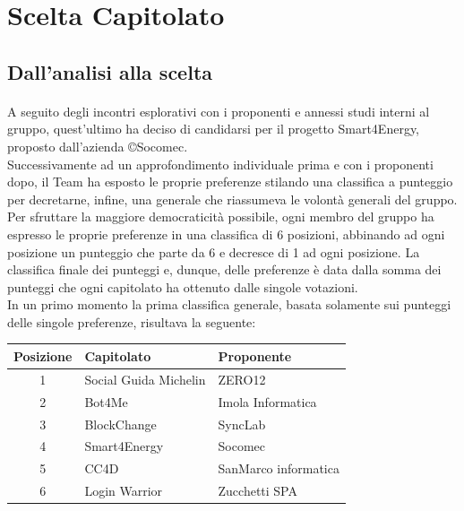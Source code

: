 \tableofcontents
\newpage
\section{Scelta Capitolato}
\subsection{Dall'analisi alla scelta}
\paragraph{}
A seguito degli incontri esplorativi con i proponenti e annessi studi interni
al gruppo, quest'ultimo ha deciso di candidarsi per il progetto Smart4Energy,
proposto dall'azienda \copyright Socomec.\\
Successivamente ad un approfondimento individuale prima e con i proponenti dopo,
il Team ha esposto le proprie preferenze stilando una classifica a punteggio per
decretarne, infine, una generale che riassumeva le volontà generali del gruppo.\\
Per sfruttare la maggiore democraticità possibile, ogni membro del gruppo ha
espresso le proprie preferenze in una classifica di 6 posizioni, abbinando ad
ogni posizione un punteggio che parte da 6 e decresce di 1 ad ogni posizione.
La classifica finale dei punteggi e, dunque, delle preferenze è data dalla somma
dei punteggi che ogni capitolato ha ottenuto dalle singole votazioni.\\
In un primo momento la prima classifica generale, basata solamente sui punteggi
delle singole preferenze, risultava la seguente:\\

\begin{center}
    \begin{tabular}{|c|l|l|}
    \hline
        Posizione & Capitolato & Proponente\\
        \hline
        1 & Social Guida Michelin & ZERO12 \\
        2 & Bot4Me & Imola Informatica \\
        3 & BlockChange & SyncLab \\
        4 & Smart4Energy & Socomec \\
        5 & CC4D & SanMarco informatica \\
        6 & Login Warrior & Zucchetti SPA \\
        \hline
    \end{tabular}
\end{center}
